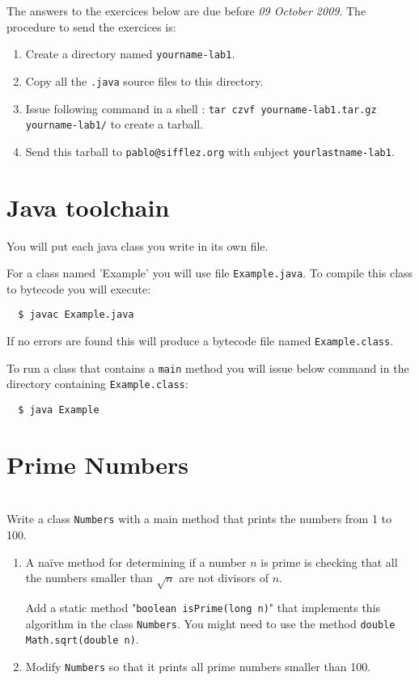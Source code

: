 \documentclass{exercices}
\renewcommand{\|}{\url|}
\begin{document}

The answers to the exercices below are due before \emph{09 October 2009}.
The procedure to send the exercices is:
\begin{enumerate}
  \item Create a directory named \verb!yourname-lab1!.
  \item Copy all the \verb!.java! source files to this directory.
  \item Issue following command in a shell : \verb!tar czvf yourname-lab1.tar.gz yourname-lab1/!
        to create a tarball.
  \item Send this tarball to \verb!pablo@sifflez.org! with subject \verb!yourlastname-lab1!.
\end{enumerate}

\section{Java toolchain}
You will put each java class you write in its own file.

For a class named 'Example' you will use file \verb!Example.java!.
To compile this class to bytecode you will execute:
\begin{verbatim}
  $ javac Example.java
\end{verbatim}
If no errors are found this will produce a bytecode file named \verb!Example.class!.

To run a class that contains a \verb!main! method you will issue below command
in the directory containing \verb!Example.class!:
\begin{verbatim}
  $ java Example
\end{verbatim}

\section{Prime Numbers}
\begin{exercice}\\
Write a class \verb!Numbers! with a main method that prints the numbers from 1 to 100.
\end{exercice}
\begin{exercice}
\begin{enumerate}
\item
A naïve method for determining if a number $n$ is prime is checking that all the numbers smaller
than $\sqrt{n}$ are not divisors of $n$.

Add a static method "\verb!boolean isPrime(long n)!" that implements this algorithm in the class \verb!Numbers!.
You might need to use the method \verb!double Math.sqrt(double n)!.
\item
 Modify \verb!Numbers! so that it prints all prime numbers smaller than 100.
\end{enumerate}
\end{exercice}
\end{document}
